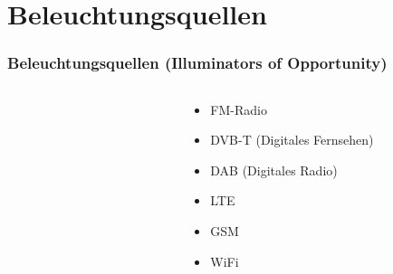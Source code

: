 \section{Beleuchtungsquellen}

\begin{frame}
  \frametitle{Beleuchtungsquellen (Illuminators of Opportunity)}

  \begin{columns}
    \begin{column}{0.2\textwidth}
      \begin{figure}
        \raggedleft{}
      \end{figure}
    \end{column}
    \begin{column}{0.8\textwidth}
      \begin{itemize}
        \item FM-Radio
        \item DVB-T (Digitales Fernsehen)
        \item DAB (Digitales Radio)
        \item LTE
        \item GSM
        \item WiFi
      \end{itemize}
    \end{column}
  \end{columns}
\end{frame}
